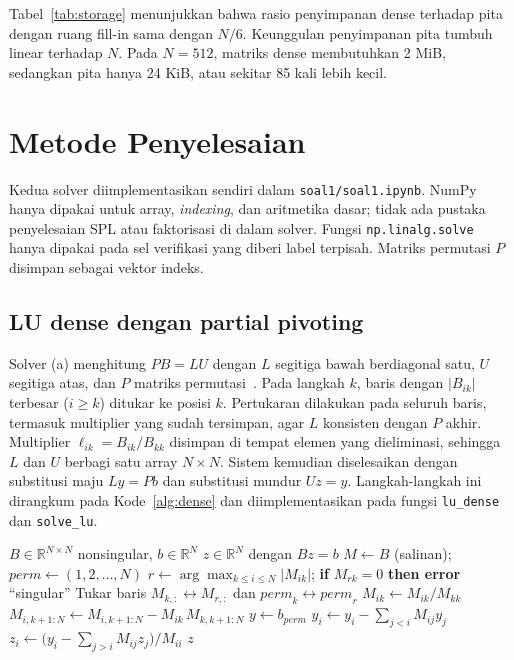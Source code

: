 \documentclass[12pt,a4paper]{article}
\newcommand{\R}{\mathbb{R}}
\numberwithin{equation}{section}
\begin{document}
Tabel~\ref{tab:storage} menunjukkan bahwa rasio penyimpanan dense terhadap pita dengan ruang fill-in sama dengan
$N/6$. Keunggulan penyimpanan pita tumbuh linear terhadap $N$. Pada $N=512$, matriks dense membutuhkan 2 MiB,
sedangkan pita hanya 24 KiB, atau sekitar 85 kali lebih kecil.

\section{Metode Penyelesaian}\label{sec:metode}
Kedua solver diimplementasikan sendiri dalam \texttt{soal1/soal1.ipynb}. NumPy hanya dipakai untuk array,
\emph{indexing}, dan aritmetika dasar; tidak ada pustaka penyelesaian SPL atau faktorisasi di dalam solver.
Fungsi \texttt{np.linalg.solve} hanya dipakai pada sel verifikasi yang diberi label terpisah. Matriks permutasi $P$
disimpan sebagai vektor indeks.

\subsection{LU dense dengan partial pivoting}
Solver (a) menghitung $PB=LU$ dengan $L$ segitiga bawah berdiagonal satu, $U$ segitiga atas, dan $P$ matriks
permutasi~\cite{heath}. Pada langkah $k$, baris dengan $\lvert B_{ik}\rvert$ terbesar ($i\ge k$) ditukar ke posisi
$k$. Pertukaran dilakukan pada seluruh baris, termasuk multiplier yang sudah tersimpan, agar $L$ konsisten dengan $P$
akhir. Multiplier $\ell_{ik}=B_{ik}/B_{kk}$ disimpan di tempat elemen yang dieliminasi, sehingga $L$ dan $U$ berbagi
satu array $N\times N$. Sistem kemudian diselesaikan dengan substitusi maju $Ly=Pb$ dan substitusi mundur $Uz=y$.
Langkah-langkah ini dirangkum pada Kode~\ref{alg:dense} dan diimplementasikan pada fungsi \texttt{lu\_dense} dan
\texttt{solve\_lu}.

\begin{algorithm}[H]
\caption{LU dense dengan \emph{partial pivoting} dan penyelesaian $Bz=b$}
\label{alg:dense}
\begin{algorithmic}[1]
\Require $B\in\R^{N\times N}$ nonsingular, $b\in\R^N$
\Ensure $z\in\R^N$ dengan $Bz=b$
\State $M\gets B$ (salinan); $\mathit{perm}\gets(1,2,\dots,N)$
  \State $r\gets\arg\max_{k\le i\le N}\lvert M_{ik}\rvert$; \textbf{if} $M_{rk}=0$ \textbf{then error} ``singular''
  \State Tukar baris $M_{k,:}\leftrightarrow M_{r,:}$ dan $\mathit{perm}_k\leftrightarrow\mathit{perm}_r$
    \State $M_{ik}\gets M_{ik}/M_{kk}$ 
    \State $M_{i,k+1:N}\gets M_{i,k+1:N}-M_{ik}\,M_{k,k+1:N}$
  \EndFor
\EndFor
\State $y\gets b_{\mathit{perm}}$ 
 
  \State $y_i\gets y_i-\sum_{j<i}M_{ij}y_j$
\EndFor
{} 
  \State $z_i\gets\bigl(y_i-\sum_{j>i}M_{ij}z_j\bigr)/M_{ii}$
\EndFor
\State \Return $z$
\end{algorithmic}
\end{algorithm}
\end{document}
